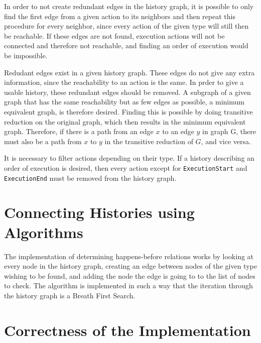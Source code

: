 	In order to not create redundant edges in the history graph, it is possible to only find the first edge from a given action to its neighbors and then repeat this procedure for every neighbor, since every action of the given type will still then be reachable. %
	If these edges are not found, execution actions will not be connected and therefore not reachable, and finding an order of execution would be impossible. %
	
	Redudant edges exist in a given history graph. These edges do not give any extra information, since the reachability to an action is the same. In prder to give a usable history, these redundant edges should be removed. 
	A subgraph of a given graph that has the same reachability but as few edges as possible, a minimum equivalent graph, is therefore desired. Finding this is possible by doing transitive reduction on the original graph, which then results in the minimum equivalent graph. 
	Therefore, if there is a path from an edge $x$ to an edge $y$ in graph G, there must also be a path from $x$ to $y$ in the transitive reduction of $G$, and vice versa. 
	
	
	It is necessary to filter actions depending on their type. If a history describing an order of execution is desired, then every action except for \texttt{ExecutionStart} and \texttt{ExecutionEnd} must be removed from the history graph. 
	
	\section{Connecting Histories using Algorithms} %
	The implementation of determining happens-before relations works by looking at every node in the history graph, creating an edge between nodes of the given type wishing to be found, and adding the node the edge is going to to the list of nodes to check. The algorithm is implemented in such a way that the iteration through the history graph is a Breath First Search. 
	
	\section{Correctness of the Implementation} %
	